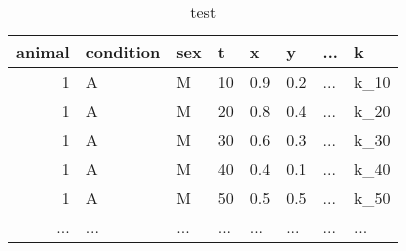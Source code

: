 \documentclass[a4paper,12pt]{article}
\begin{document}
\begin{table}[]
\centering
\caption{test}
\label{test}
\begin{tabular}{|r|L|L|L|L|L|L|L|}
\hline
{} 
{\color[HTML]{333333} \textbf{animal}} & {\color[HTML]{333333} \textbf{condition}} & {\color[HTML]{333333} \textbf{sex}} & {\color[HTML]{333333} \textbf{t}} & {\color[HTML]{333333} \textbf{x}} & {\color[HTML]{333333} \textbf{y}} & {\color[HTML]{333333} \textbf{...}} & {\color[HTML]{333333} \textbf{k}} \\ \hline
{} 
1                                      & A                                         & M                                   &  10                                & 0.9                               & 0.2                               & ...                                 & k_{10}                            \\ \hline
{} 
1                                      & A                                         & M                                   &  20                                & 0.8                               & 0.4                               & ...                                 & k_{20}                            \\ \hline
{} 
1                                      & A                                         & M                                   &  30                                & 0.6                               & 0.3                               & ...                                 & k_{30}                            \\ \hline
{} 
1                                      & A                                         & M                                   &  40                                & 0.4                               & 0.1                               & ...                                 & k_{40}                            \\ \hline
{} 
1                                      & A                                         & M                                   &  50                                & 0.5                               & 0.5                               & ...                                 & k_{50}                            \\ \hline
...                               & ...                               & ...                               & ...                               & ...                               & ...                               & ...                                 & ...                                \\ \hline

\end{tabular}
\end{table}
\end{document}
